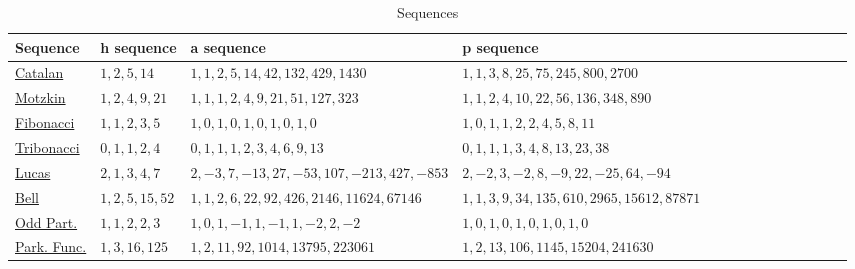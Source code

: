 \documentclass[11pt]{amsart}
\theoremstyle{definition}
\numberwithin{equation}{section}
\begin{document}
\newpage
 \begin{table}[h]
    \hspace*{-1cm} 
    \begin{tabular}{|l|l|l|l||l|l|l||l|l|l|l||l|l|l|}
        \hline
        Sequence & h sequence & a sequence & p sequence \\
        \hline
        \href{https://oeis.org/A000108}{Catalan} & \(1, 2, 5, 14\) & 
        \(1, 1, 2, 5, 14, 42, 132, 429, 1430\) & 
        \(1, 1, 3, 8, 25, 75, 245, 800, 2700\) \\
        
        
        \hline
        \href{https://oeis.org/A001006}{Motzkin}  & \(1, 2, 4, 9, 21\) & 
        \(1, 1, 1, 2, 4, 9, 21, 51, 127, 323\) & 
        \(1, 1, 2, 4, 10, 22, 56, 136, 348, 890\)

          \\
        \hline
        \href{https://oeis.org/A000045}{ Fibonacci}
        & \(1, 1, 2, 3,5\) & 
        \(1, 0, 1, 0, 1, 0, 1, 0, 1, 0\) & 
        \(1, 0, 1, 1, 2, 2, 4, 5, 8, 11\)

         \\
        \hline
        \href{https://oeis.org/A000073}{Tribonacci} & \(0, 1, 1, 2, 4\) & 
        \(0, 1, 1, 1, 2, 3, 4, 6, 9, 13\) & 
        \(0, 1, 1, 1, 3, 4, 8, 13, 23, 38\)

             \\
        \hline
        \href{https://oeis.org/A000032}{Lucas} & \(2, 1, 3, 4, 7\) & 
        \(2, -3, 7, -13, 27, -53, 107, -213, 427, -853\) & 
        \(2, -2, 3, -2, 8, -9, 22, -25, 64, -94\)

         \\
        \hline
        \href{https://oeis.org/A000110}{Bell}
         & \(1, 2, 5, 15, 52\) & 
        \(1, 1, 2, 6, 22, 92, 426, 2146, 11624, 67146\) & 
        \(1, 1, 3, 9, 34, 135, 610, 2965, 15612, 87871\)


   \\
        \hline
\href{https://oeis.org/A000009}{Odd Part.}
         & \(1, 1, 2, 2, 3\) & 
        \(1, 0, 1, -1, 1, -1, 1, -2, 2, -2\) & 
        \(1, 0, 1, 0, 1, 0, 1, 0, 1, 0\)

   \\   
        \hline
        \href{https://oeis.org/A000272}{Park. Func.}
         & \(1,3, 16, 125\) & 
        \(1, 2, 11, 92, 1014, 13795, 223061\) & 
        \(1, 2, 13, 106, 1145, 15204, 241630\)

   \\  
        \hline
    \end{tabular}
    \caption{Sequences}
    \label{tab:sequences}
\end{table}
\end{document}
